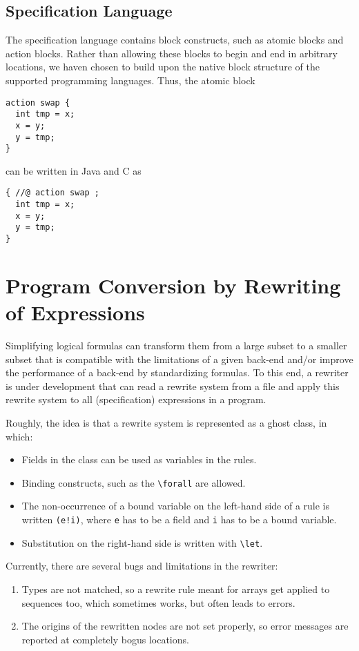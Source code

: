 \documentclass{report}
\begin{document}
\section{Specification Language}

The specification language contains block constructs, such as atomic blocks and action blocks.
Rather than allowing these blocks to begin and end in arbitrary locations, we haven chosen to
build upon the native block structure of the supported programming languages. Thus, the atomic
block
\begin{lstlisting}
action swap {
  int tmp = x;
  x = y;
  y = tmp; 
}
\end{lstlisting}
can be written in Java and C as
\begin{lstlisting}
{ //@ action swap ;
  int tmp = x;
  x = y;
  y = tmp; 
}
\end{lstlisting}





\chapter{Program Conversion by Rewriting of Expressions}

Simplifying logical formulas can transform them from a large subset to
a smaller subset that is compatible with the limitations of a given back-end
and/or improve the performance of a back-end by standardizing formulas.
To this end, a rewriter is under development that can read a rewrite system
from a file and apply this rewrite system to all (specification) expressions
in a program.

Roughly, the idea is that a rewrite system is represented as a ghost class,
in which:
\begin{itemize}
\item Fields in the class can be used as variables in the rules.
\item Binding constructs, such as the \lstinline+\forall+ are allowed.
\item The non-occurrence of a bound variable on the left-hand side of a rule
is written \lstinline+(e!i)+, where \lstinline+e+ has to be a field and
\lstinline+i+ has to be a bound variable.
\item Substitution on the right-hand side is written with \lstinline+\let+.
\end{itemize}

Currently, there are several bugs and limitations in the rewriter:
\begin{enumerate}
\item Types are not matched, so a rewrite rule meant for arrays get applied to sequences too,
which sometimes works, but often leads to errors.
\item The origins of the rewritten nodes are not set properly, so error messages are
reported at completely bogus locations.
\end{enumerate}

%
%

\appendix


\end{document}
